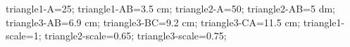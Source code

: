 \documentclass[exercice]{thedocument}%
\begin{document}
%
\>triangle1-A=25;%
\>triangle1-AB=3.5 cm;%
\>triangle2-A=50;%
\>triangle2-AB=5 dm;%
\>triangle3-AB=6.9 cm;%
\>triangle3-BC=9.2 cm;%
\>triangle3-CA=11.5 cm;%
\>triangle1-scale=1;%
\>triangle2-scale=0.65;%
\>triangle3-scale=0.75;%
%
\end{document}
